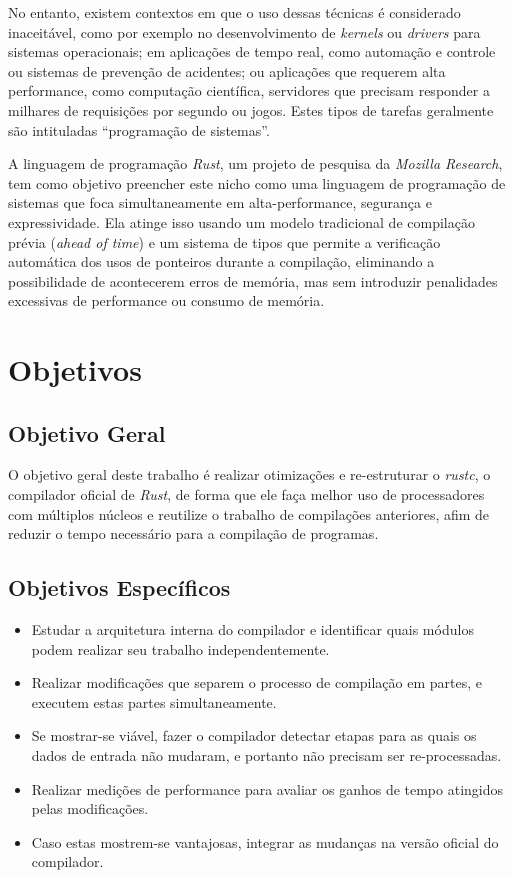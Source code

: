 \documentclass[12pt]{article}
\begin{document}
No entanto, existem contextos em que o uso dessas técnicas é considerado inaceitável, como por exemplo no desenvolvimento de \emph{kernels} ou \emph{drivers} para sistemas operacionais; em aplicações de tempo real, como automação e controle ou sistemas de prevenção de acidentes; ou aplicações que requerem alta performance, como computação científica, servidores que precisam responder a milhares de requisições por segundo ou jogos. Estes tipos de tarefas geralmente são intituladas ``programação de sistemas''.

A linguagem de programação \emph{Rust}, um projeto de pesquisa da \emph{Mozilla Research}, tem como objetivo preencher este nicho como uma linguagem de programação de sistemas que foca simultaneamente em alta-performance, segurança e expressividade. Ela atinge isso usando um modelo tradicional de compilação prévia (\emph{ahead of time}) e um sistema de tipos que permite a verificação automática dos usos de ponteiros durante a compilação, eliminando a possibilidade de acontecerem erros de memória, mas sem introduzir penalidades excessivas de performance ou consumo de memória.

\section{Objetivos}

\subsection{Objetivo Geral}

O objetivo geral deste trabalho é realizar otimizações e re-estruturar o \emph{rustc}, o compilador oficial de \emph{Rust}, de forma que ele faça melhor uso de processadores com múltiplos núcleos e reutilize o trabalho de compilações anteriores, afim de reduzir o tempo necessário para a compilação de programas.

\subsection{Objetivos Específicos}
\begin{itemize}
	\item Estudar a arquitetura interna do compilador e identificar quais módulos podem realizar seu trabalho independentemente.
	\item Realizar modificações que separem o processo de compilação em partes, e executem estas partes simultaneamente.
	\item Se mostrar-se viável, fazer o compilador detectar etapas para as quais os dados de entrada não mudaram, e portanto não precisam ser re-processadas.
	\item Realizar medições de performance para avaliar os ganhos de tempo atingidos pelas modificações.
	\item Caso estas mostrem-se vantajosas, integrar as mudanças na versão oficial do compilador.
\end{itemize}
\end{document}
